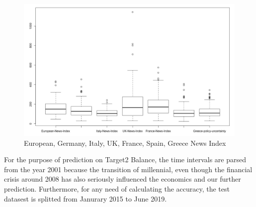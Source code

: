 \documentclass[12pt]{article}
\begin{document}
\begin{figure}
  \includegraphics[width=\linewidth]{Uncertainty.png}
  \caption{European, Germany, Italy, UK, France, Spain, Greece News Index}
  \label{fig:policy_uncertainty}
\end{figure}
For the purpose of prediction on Target2 Balance, the time intervals are parsed from the year 2001 because the transition of millennial, even though the financial crisis around 2008 has also seriously influenced the economics and our further prediction. Furthermore, for any need of calculating the accuracy, the test datasest is splitted from Janurary 2015 to June 2019. 
\end{document}
